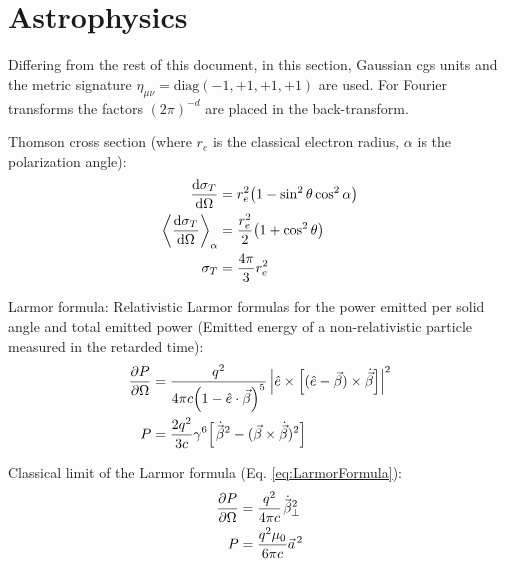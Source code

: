 \section{Astrophysics}
	Differing from the rest of this document, in this section, Gaussian cgs units and the metric signature $\eta_{\mu\nu}=\mathrm{diag}(-1,+1,+1,+1)$ are used. For Fourier transforms the factors $(2\pi)^{-d}$ are placed in the back-transform.

	Thomson cross section (where $r_e$ is the classical electron radius, $\alpha$ is the polarization angle):
	\begin{equation}
		\begin{aligned}
			\dv{\sigma_T}{\Omega} &= r_e^2 \qty(1-\sin^2 \theta \cos^2 \alpha) \\
			\left\langle \dv{\sigma_T}{\Omega} \right\rangle_{\alpha} &= \frac{r_e^2}{2} \qty(1+\cos^2 \theta) \\
			\sigma_T &= \frac{4\pi}{3}r_e^2 \\
		\end{aligned}
	\end{equation}

	\noindent
	Larmor formula:
	Relativistic Larmor formulas for the power emitted per solid angle and total emitted power (Emitted energy of a non-relativistic particle measured in the retarded time):
	\begin{equation}
		\label{eq:LarmorFormula}
		\begin{aligned}
			\pdv{P}{\Omega} &= \frac{q^2}{4\pi c\qty(1-\hat{e}\cdot\vec{\beta})^5} \left| \hat{e}\times\qty[(\hat{e}-\vec{\beta}) \times \dot{\vec{\beta}}] \right|^2 \\
			P &= \frac{2q^2}{3c}\gamma^6\qty[\dot{\pvec{\beta}}^2 - (\vec{\beta}\times\dot{\vec{\beta}})^2] \\
		\end{aligned}
	\end{equation}

	\noindent 
	Classical limit of the Larmor formula (Eq. \ref{eq:LarmorFormula}):
	\begin{equation}
		\begin{aligned}
			\pdv{P}{\Omega} &= \frac{q^2}{4\pi c}\dot{\pvec{\beta}}_\perp^2 \\
			P &= \frac{q^2 \mu_0}{6\pi c}\pvec{a}^2\\
		\end{aligned}
	\end{equation}

